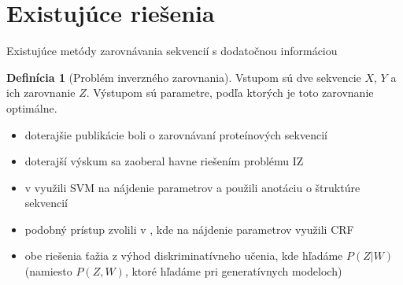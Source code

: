 \documentclass[xcolor=dvipsnames, compress, 12pt]{beamer}
\theoremstyle{definition}
\newtheorem{df}[vt]{Definícia}
\begin{document}

\section{Existujúce riešenia}
\begin{frame}{Existujúce metódy zarovnávania sekvencií s dodatočnou informáciou}
  \begin{df}[Problém inverzného zarovnania]
  Vstupom sú dve sekvencie $X$, $Y$ a ich zarovnanie $Z$.
  Výstupom sú parametre, podľa ktorých je toto zarovnanie optimálne.
  \end{df}
  \pause
  \begin{itemize}
    \item doterajšie publikácie boli o zarovnávaní proteínových sekvencií
    \item doterajší výskum sa zaoberal havne riešením problému IZ
    \item v \cite{svmTrainingProteinsAlignment} využili SVM na nájdenie parametrov a použili anotáciu o štruktúre sekvencií
    \item podobný prístup zvolili v \cite{contralign}, kde na nájdenie parametrov využili CRF
    \pause
    \item obe riešenia ťažia z výhod diskriminatívneho učenia, kde hľadáme $P(Z|W)$ (namiesto $P(Z,W)$, ktoré hľadáme pri generatívnych modeloch)
  \end{itemize}
\end{frame}
\end{document}
